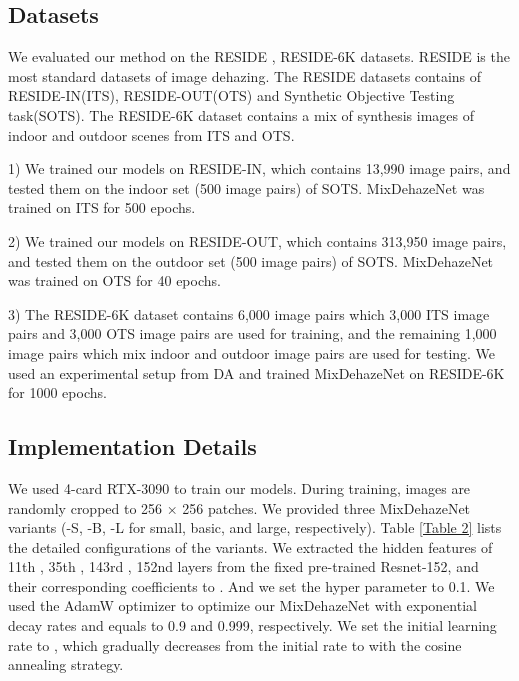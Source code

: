\documentclass[10pt,twocolumn,letterpaper]{article}
\begin{document}
\subsection{Datasets}
We evaluated our method on the RESIDE \cite{dataset}, RESIDE-6K datasets. RESIDE\cite{dataset} is the most standard datasets of image dehazing. The RESIDE datasets contains of RESIDE-IN(ITS), RESIDE-OUT(OTS) and Synthetic Objective Testing task(SOTS). The RESIDE-6K dataset contains a mix of synthesis images of indoor and outdoor scenes from ITS and OTS.

1) We trained our models on RESIDE-IN, which contains 13,990 image pairs, and tested them on the indoor set (500 image pairs) of SOTS. MixDehazeNet was trained on ITS for 500 epochs.

2) We trained our models on RESIDE-OUT, which contains 313,950 image pairs, and tested them on the outdoor set (500 image pairs) of SOTS. MixDehazeNet was trained on OTS for 40 epochs.

3) The RESIDE-6K dataset contains 6,000 image pairs which 3,000 ITS image pairs and 3,000 OTS image pairs are used for training, and the remaining 1,000 image pairs which mix indoor and outdoor image pairs are used for testing. We used an experimental setup from DA \cite{DA} and trained MixDehazeNet on RESIDE-6K for 1000 epochs.

\subsection{Implementation Details}
We used 4-card RTX-3090 to train our models. During training, images are randomly cropped to 256 × 256 patches. We provided three MixDehazeNet variants (-S, -B, -L for small, basic, and large, respectively). Table \ref{Table 2} lists the detailed configurations of the variants. We extracted the hidden features of 11th , 35th , 143rd , 152nd layers from the fixed pre-trained Resnet-152, and their corresponding coefficients  to . And we set the hyper parameter  to 0.1. We used the AdamW optimizer to optimize our MixDehazeNet with exponential decay rates  and  equals to 0.9 and 0.999, respectively. We set the initial learning rate to , which gradually decreases from the initial rate to  with the cosine annealing strategy. 
\end{document}
